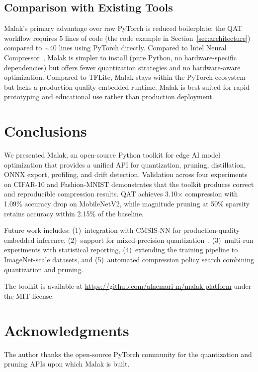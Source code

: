 \documentclass[10pt,twocolumn]{article}
\begin{document}
\subsection{Comparison with Existing Tools}

Malak's primary advantage over raw PyTorch is reduced boilerplate: the QAT workflow requires 5 lines of code (the code example in Section~\ref{sec:architecture}) compared to $\sim$40 lines using PyTorch directly.
Compared to Intel Neural Compressor~\cite{intel-nc}, Malak is simpler to install (pure Python, no hardware-specific dependencies) but offers fewer quantization strategies and no hardware-aware optimization.
Compared to TFLite, Malak stays within the PyTorch ecosystem but lacks a production-quality embedded runtime.
Malak is best suited for rapid prototyping and educational use rather than production deployment.

\section{Conclusions}
\label{sec:conclusion}

We presented Malak, an open-source Python toolkit for edge AI model optimization that provides a unified API for quantization, pruning, distillation, ONNX export, profiling, and drift detection.
Validation across four experiments on CIFAR-10 and Fashion-MNIST demonstrates that the toolkit produces correct and reproducible compression results.
QAT achieves 3.10$\times$ compression with 1.09\% accuracy drop on MobileNetV2, while magnitude pruning at 50\% sparsity retains accuracy within 2.15\% of the baseline.

Future work includes:
(1)~integration with CMSIS-NN for production-quality embedded inference,
(2)~support for mixed-precision quantization~\cite{mixed-precision},
(3)~multi-run experiments with statistical reporting,
(4)~extending the training pipeline to ImageNet-scale datasets, and
(5)~automated compression policy search combining quantization and pruning.

The toolkit is available at \url{https://github.com/alnemari-m/malak-platform} under the MIT license.

\section*{Acknowledgments}
The author thanks the open-source PyTorch community for the quantization and pruning APIs upon which Malak is built.
\end{document}
